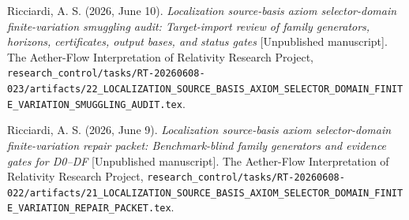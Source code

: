 \documentclass[11pt]{article}
\begin{document}
Ricciardi, A. S. (2026, June 10). \emph{Localization source-basis axiom
selector-domain finite-variation smuggling audit: Target-import review of
family generators, horizons, certificates, output bases, and status gates}
[Unpublished manuscript]. The Aether-Flow Interpretation of Relativity
Research Project,
\texttt{research\_control/tasks/RT-20260608-023/artifacts/22\_LOCALIZATION\_SOURCE\_BASIS\_AXIOM\_SELECTOR\_DOMAIN\_FINITE\_VARIATION\_SMUGGLING\_AUDIT.tex}.

Ricciardi, A. S. (2026, June 9). \emph{Localization source-basis axiom
selector-domain finite-variation repair packet: Benchmark-blind family
generators and evidence gates for D0--DF} [Unpublished manuscript]. The
Aether-Flow Interpretation of Relativity Research Project,
\texttt{research\_control/tasks/RT-20260608-022/artifacts/21\_LOCALIZATION\_SOURCE\_BASIS\_AXIOM\_SELECTOR\_DOMAIN\_FINITE\_VARIATION\_REPAIR\_PACKET.tex}.
\end{document}
